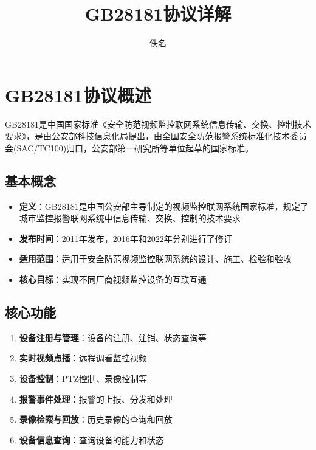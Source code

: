\documentclass[12pt,UTF8]{ctexbook}
\title{\heiti\zihao{0} GB28181协议详解}
\author{佚名}
\date{}
\begin{document}
\maketitle
\tableofcontents

\frontmatter

\mainmatter

\chapter{GB28181协议概述}

GB28181是中国国家标准《安全防范视频监控联网系统信息传输、交换、控制技术要求》，是由公安部科技信息化局提出，由全国安全防范报警系统标准化技术委员会(SAC/TC100)归口，公安部第一研究所等单位起草的国家标准。

\section{基本概念}

\begin{itemize}
  \item \textbf{定义}：GB28181是中国公安部主导制定的视频监控联网系统国家标准，规定了城市监控报警联网系统中信息传输、交换、控制的技术要求
  \item \textbf{发布时间}：2011年发布，2016年和2022年分别进行了修订
  \item \textbf{适用范围}：适用于安全防范视频监控联网系统的设计、施工、检验和验收
  \item \textbf{核心目标}：实现不同厂商视频监控设备的互联互通
\end{itemize}

\section{核心功能}

\begin{enumerate}
  \item \textbf{设备注册与管理}：设备的注册、注销、状态查询等
  \item \textbf{实时视频点播}：远程调看监控视频
  \item \textbf{设备控制}：PTZ控制、录像控制等
  \item \textbf{报警事件处理}：报警的上报、分发和处理
  \item \textbf{录像检索与回放}：历史录像的查询和回放
  \item \textbf{设备信息查询}：查询设备的能力和状态
\end{enumerate}
\end{document}
